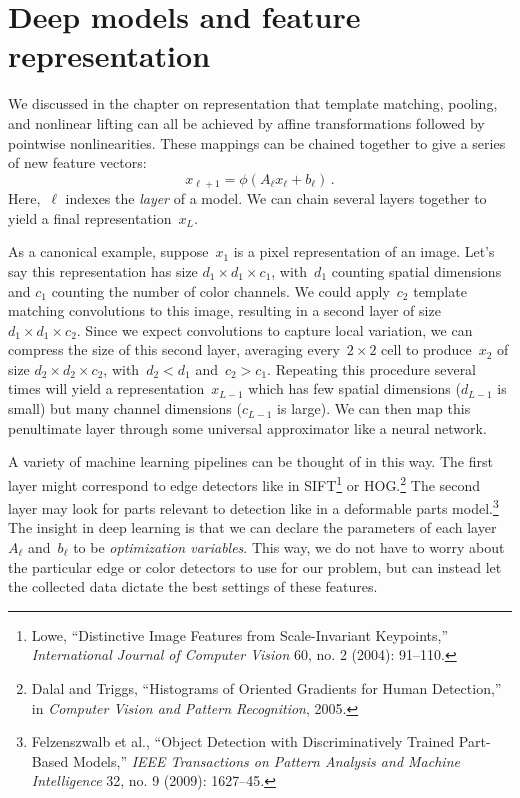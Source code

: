 \documentclass{tufte-book}
\begin{document}
\hypertarget{deep-models-and-feature-representation}{%
\section{Deep models and feature
representation}\label{deep-models-and-feature-representation}}

We discussed in the chapter on representation that template matching,
pooling, and nonlinear lifting can all be achieved by affine
transformations followed by pointwise nonlinearities. These mappings can
be chained together to give a series of new feature vectors: \[
    x_{\ell+1} = \phi(A_\ell x_\ell+b_\ell)\,.
\] Here,~\(\ell\) indexes the \emph{layer} of a model. We can chain
several layers together to yield a final representation~\(x_L\).

As a canonical example, suppose~\(x_1\) is a pixel representation of an
image. Let's say this representation has size
\(d_1 \times d_1 \times c_1\), with~\(d_1\) counting spatial dimensions
and \(c_1\) counting the number of color channels. We could
apply~\(c_2\) template matching convolutions to this image, resulting in
a second layer of size~\(d_1 \times d_1 \times c_2\). Since we expect
convolutions to capture local variation, we can compress the size of
this second layer, averaging every~\(2\times 2\) cell to produce~\(x_2\)
of size \(d_2 \times d_2 \times c_2\), with~\(d_2<d_1\) and~\(c_2>c_1\).
Repeating this procedure several times will yield a
representation~\(x_{L-1}\) which has few spatial dimensions (\(d_{L-1}\)
is small) but many channel dimensions (\(c_{L-1}\) is large). We can
then map this penultimate layer through some universal approximator like
a neural network.

A variety of machine learning pipelines can be thought of in this way.
The first layer might correspond to edge detectors like in
SIFT\footnote{Lowe, {``Distinctive Image Features from Scale-Invariant
  Keypoints,''} \emph{International Journal of Computer Vision} 60, no.
  2 (2004): 91--110.} or HOG.\footnote{Dalal and Triggs, {``Histograms
  of Oriented Gradients for Human Detection,''} in \emph{Computer Vision
  and Pattern Recognition}, 2005.} The second layer may look for parts
relevant to detection like in a deformable parts model.\footnote{Felzenszwalb
  et al., {``Object Detection with Discriminatively Trained Part-Based
  Models,''} \emph{{IEEE} Transactions on Pattern Analysis and Machine
  Intelligence} 32, no. 9 (2009): 1627--45.} The insight in deep
learning is that we can declare the parameters of each layer~\(A_\ell\)
and~\(b_\ell\) to be \emph{optimization variables}. This way, we do not
have to worry about the particular edge or color detectors to use for
our problem, but can instead let the collected data dictate the best
settings of these features.
\end{document}
